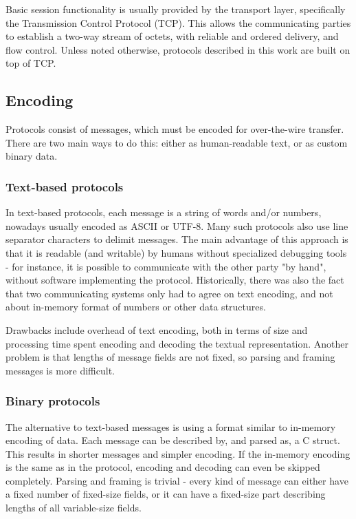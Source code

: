 Basic session functionality is usually provided by the transport layer, specifically the Transmission Control
Protocol (TCP). This allows the communicating parties to establish a two-way stream of octets, with reliable
and ordered delivery, and flow control. Unless noted otherwise, protocols described in this work are built on
top of TCP.


\subsection{Encoding}

Protocols consist of messages, which must be encoded for over-the-wire transfer. There are two main ways to do
this: either as human-readable text, or as custom binary data.

\subsubsection{Text-based protocols}

In text-based protocols, each message is a string of words and/or numbers, nowadays usually encoded as ASCII
or UTF-8. Many such protocols also use line separator characters to delimit messages. The main advantage of
this approach is that it is readable (and writable) by humans without specialized debugging tools - for
instance, it is possible to communicate with the other party "by hand", without software implementing the
protocol. Historically, there was also the fact that two communicating systems only had to agree on text
encoding, and not about in-memory format of numbers or other data structures.

Drawbacks include overhead of text encoding, both in terms of size and processing time spent encoding and
decoding the textual representation. Another problem is that lengths of message fields are not fixed, so
parsing and framing messages is more difficult.

\subsubsection{Binary protocols}

The alternative to text-based messages is using a format similar to in-memory encoding of data. Each message
can be described by, and parsed as, a C struct\footnotemark[2]. This results in shorter messages and simpler
encoding. If the in-memory encoding is the same as in the protocol, encoding and decoding can even be skipped
completely. Parsing and framing is trivial - every kind of message can either have a fixed number of
fixed-size fields, or it can have a fixed-size part describing lengths of all variable-size fields.

